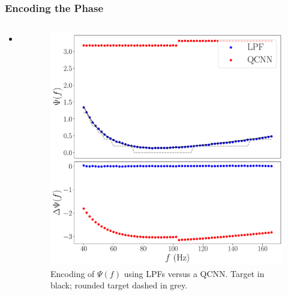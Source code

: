 \documentclass{beamer}
\begin{document}
\begin{frame}
\frametitle{Encoding the Phase}
\begin{columns}
\begin{column}{0.5\textwidth}
\begin{itemize}
\item ...
\end{itemize}
\end{column}
\begin{column}{0.5\textwidth}  
\begin{figure}[h]
\centering
\includegraphics[width=\textwidth]{im/phase_comp}
\caption{Encoding of $\Psi(f)$ using LPFs versus a QCNN. Target in black; rounded target dashed in grey.}
\end{figure}
\end{column}
\end{columns}
\end{frame}
\end{document}
